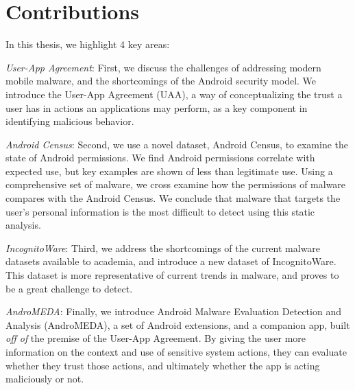 \section{Contributions}
In this thesis, we highlight 4 key areas:
\begin{smitemize}
\item \textit{User-App Agreement}: First, we discuss the challenges of addressing modern mobile malware, and the shortcomings of the Android security model. We introduce the User-App Agreement (UAA), a way of conceptualizing the trust a user has in actions an applications may perform, as a key component in identifying malicious behavior.
\item \textit{Android Census}: Second, we use a novel dataset, Android Census, to examine the state of Android permissions. We find Android permissions correlate with expected use, but key examples are shown of less than legitimate use. Using a comprehensive set of malware, we cross examine how the permissions of malware compares with the Android Census. We conclude that malware that targets the user's personal information is the most difficult to detect using this static analysis.
\item \textit{IncognitoWare}: Third, we address the shortcomings of the current malware datasets available to academia, and introduce a new dataset of IncognitoWare. This dataset is more representative of current trends in malware, and proves to be a great challenge to detect.
\item \textit{AndroMEDA}: Finally, we introduce Android Malware Evaluation Detection and Analysis (AndroMEDA), a set of Android extensions, and a companion app, built \textit{off of} the premise of the User-App Agreement. By giving the user more information on the context and use of sensitive system actions, they can evaluate whether they trust those actions, and ultimately whether the app is acting maliciously or not.
\end{smitemize}








